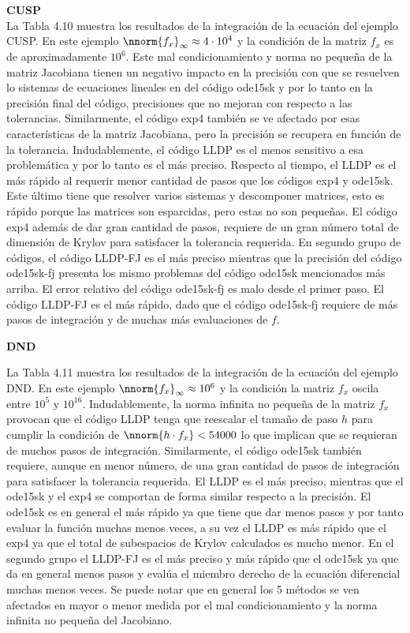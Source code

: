 \textbf{CUSP}\\
La Tabla 4.10 muestra los resultados de la integración de la ecuación del ejemplo CUSP. En este ejemplo $\nnorm{f_x}_\infty\approx4\cdot10^4$ y la condición de la matriz $f_x$ es de aproximadamente $10^6$. Este mal condicionamiento y norma no peque\~na de la matriz Jacobiana tienen un negativo impacto en la precisión con que se resuelven lo sistemas de ecuaciones lineales en del código ode15sk y por lo tanto en la precisión final del código, precisiones que no mejoran con respecto a las tolerancias. Similarmente, el código exp4 también se ve afectado por esas características de la matriz Jacobiana, pero la precisión se recupera en función de la tolerancia. Indudablemente, el código LLDP es el menos sensitivo a esa problemática y por lo tanto es el más preciso. Respecto al tiempo, el LLDP es el más rápido al requerir menor cantidad de pasos que los códigos exp4 y ode15sk. Este último tiene que resolver varios sistemas y descomponer matrices, esto es rápido porque las matrices son esparcidas, pero estas no son peque\~nas. El código exp4 además de dar gran cantidad de pasos, requiere de un gran número total de dimensión de Krylov para satisfacer la tolerancia requerida. 
En segundo grupo de códigos, el código LLDP-FJ es el más preciso mientras que la precisión del código ode15sk-fj presenta los mismo problemas del código ode15sk mencionados más arriba. El error relativo del código 
ode15sk-fj es malo desde el primer paso. El código LLDP-FJ es el más rápido, dado que el código ode15sk-fj requiere de más pasos de integración y de muchas más evaluaciones de $f$.
 
\textbf{DND}


La Tabla 4.11 muestra los resultados de la integración de la ecuación del ejemplo DND. En este ejemplo $\nnorm{f_x}_\infty\approx10^6$ y la condición la matriz $f_x$ oscila entre $10^5$ y $10^{16}$. Indudablemente, la norma infinita no peque\~na de la matriz $f_x$ provocan que el código LLDP tenga que reescalar el tamaño de paso $h$ para cumplir la condición de $\nnorm{h\cdot f_x}<54000$ lo que implican que se requieran de muchos pasos de integración. Similarmente, el código ode15sk también requiere, aunque en menor número, de una gran cantidad de pasos de integración para satisfacer la tolerancia requerida. El LLDP es el más preciso, mientras que el ode15sk y el
exp4 se comportan de forma similar respecto a la precisión. El ode15sk es en general el más rápido ya que tiene que
dar menos pasos y por tanto evaluar la función muchas menos veces, a su vez el LLDP es más rápido que el exp4 ya que
el total de subespacios de Krylov calculados es mucho menor.
En el segundo grupo el LLDP-FJ es el más preciso y más rápido que el ode15sk ya que da en general menos pasos y 
evalúa el miembro derecho de la ecuación diferencial muchas menos veces. Se puede notar que en general los 5 métodos
se ven afectados en mayor o menor medida por el mal condicionamiento y la norma infinita no peque\~na del Jacobiano.


